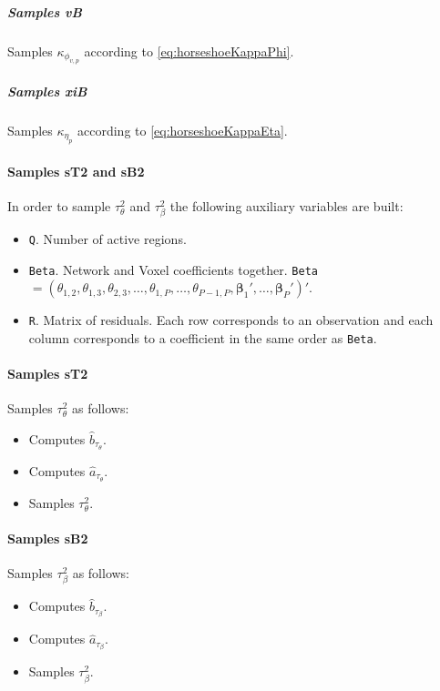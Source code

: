 \documentclass[
]{article}
\providecommand{\tightlist}{%
  \setlength{\itemsep}{0pt}\setlength{\parskip}{0pt}}
\begin{document}
\subparagraph{Samples vB}\label{samples-vb}

Samples \(\kappa_{\phi_{v,p}}\) according to \eqref{eq:horseshoeKappaPhi}.

\subparagraph{Samples xiB}\label{samples-xib}

Samples \(\kappa_{\eta_p}\) according to \eqref{eq:horseshoeKappaEta}.

\paragraph{Samples sT2 and sB2}\label{samples-st2-and-sb2}

In order to sample \(\tau^2_\theta\) and \(\tau^2_\beta\) the following auxiliary
variables are built:

\begin{itemize}
\tightlist
\item
  \texttt{Q}. Number of active regions.
\item
  \texttt{Beta}. Network and Voxel coefficients together. \texttt{Beta}\(=(\theta_{1,2},\theta_{1,3},\theta_{2,3},\ldots,\theta_{1,P},\ldots,\theta_{P-1,P}, {\boldsymbol \beta} _1',\ldots, {\boldsymbol \beta} _P')'\).
\item
  \texttt{R}. Matrix of residuals. Each row corresponds to an observation and each
  column corresponds to a coefficient in the same order as \texttt{Beta}.
\end{itemize}

\paragraph{Samples sT2}\label{samples-st2}

Samples \(\tau^2_\theta\) as follows:

\begin{itemize}
\tightlist
\item
  Computes \(\hat{b}_{\tau_\theta}\).
\item
  Computes \(\hat{a}_{\tau_\theta}\).
\item
  Samples \(\tau^2_\theta\).
\end{itemize}

\paragraph{Samples sB2}\label{samples-sb2}

Samples \(\tau^2_\beta\) as follows:

\begin{itemize}
\tightlist
\item
  Computes \(\hat{b}_{\tau_\beta}\).
\item
  Computes \(\hat{a}_{\tau_\beta}\).
\item
  Samples \(\tau^2_\beta\).
\end{itemize}
\end{document}
